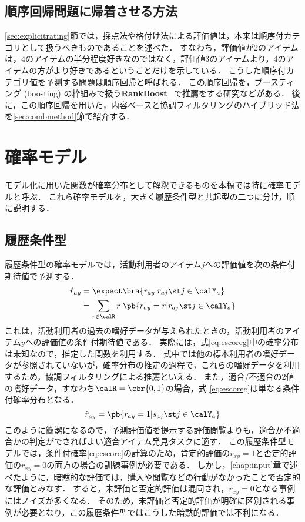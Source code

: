 \subsection{順序回帰問題に帰着させる方法}

\ref{sec:explicitrating}節では，採点法や格付け法による評価値は，本来は順序付カテゴリとして扱うべきものであることを述べた．
すなわち，評価値が2のアイテムは，4のアイテムの半分程度好きなのではなく，評価値3のアイテムより，4のアイテムの方がより好きであるということだけを示している．
こうした順序付カテゴリ値を予測する問題は順序回帰と呼ばれる．
この順序回帰を，ブースティング (boosting) \cite{icml:96:02,jjsai:99:01} の枠組みで扱う\textbf{RankBoost}~\cite{icml:98:03,jmlr:03:02} で推薦をする研究などがある．
後に，この順序回帰を用いた，内容ベースと協調フィルタリングのハイブリッド法を\ref{sec:combmethod}節で紹介する．

\section{確率モデル}
\label{sec:probmodel}

モデル化に用いた関数が確率分布として解釈できるものを本稿では特に確率モデルと呼ぶ．
これら確率モデルを，大きく履歴条件型と共起型の二つに分け，順に説明する．

\subsection{履歴条件型}

履歴条件型の確率モデルでは，活動利用者のアイテム$j$への評価値を次の条件付期待値で予測する\cite{uai:98:01}．
\begin{align}
\hat{r}_{ay} & = \expect\bra{r_{ay}|r_{aj}\st j\in\calY_a}\nonumber\\
& = \sum_{r\in\calR} r\;\pb{r_{ay}=r|r_{aj}\st j\in\calY_a}
\label{eq:escoreg}
\end{align}
これは，活動利用者の過去の嗜好データが与えられたときの，活動利用者のアイテム$y$への評価値の条件付期待値である．
実際には，式\eqref{eq:escoreg}中の確率分布は未知なので，推定した関数を利用する．
式中では他の標本利用者の嗜好データが参照されていないが，確率分布の推定の過程で，これらの嗜好データを利用するため，協調フィルタリングによる推薦といえる．
また，適合/不適合の2値の嗜好データ，すなわち$\calR=\cbr{0,1}$の場合，式
\eqref{eq:escoreg}は単なる条件付確率分布となる．
\begin{equation}
\hat{r}_{ay}=\pb{r_{ay}=1|s_{aj}\st j\in \calY_a}
\label{eq:escore}
\end{equation}
このように簡潔になるので，予測評価値を提示する評価閲覧よりも，適合か不適合かの判定ができればよい適合アイテム発見タスクに適す．
この履歴条件型モデルでは，条件付確率\eqref{eq:escore}の計算のため，肯定的評価の$r_{xy}=1$と否定的評価の$r_{xy}=0$の両方の場合の訓練事例が必要である．
しかし，\ref{chap:input}章で述べたように，暗黙的な評価では，購入や閲覧などの行動がなかったことで否定的な評価とみなす．
すると，未評価と否定的評価は混同され，$r_{xy}=0$となる事例にはノイズが多くなる．
そのため，未評価と否定的評価が明確に区別される事例が必要となり，この履歴条件型ではこうした暗黙的評価では不利になる．

